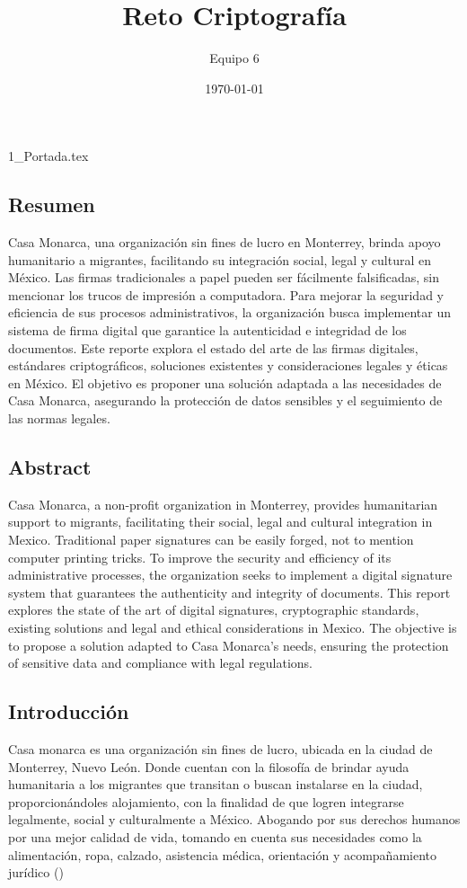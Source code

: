 \documentclass[12pt]{article}
\title{Reto Criptografía}
\author{Equipo 6}
\date{\today}
\begin{document}
{1_Portada.tex}
\newpage
\tableofcontents %
\thispagestyle{empty}

\newpage
\subsection{Resumen} %
Casa Monarca, una organización sin fines de lucro en Monterrey, brinda apoyo humanitario a migrantes, facilitando su integración social, legal y cultural en México. Las firmas tradicionales a papel pueden ser fácilmente falsificadas, sin mencionar los trucos de impresión a computadora. Para mejorar la seguridad y eficiencia de sus procesos administrativos, la organización busca implementar un sistema de firma digital que garantice la autenticidad e integridad de los documentos. Este reporte explora el estado del arte de las firmas digitales, estándares criptográficos, soluciones existentes y consideraciones legales y éticas en México. El objetivo es proponer una solución adaptada a las necesidades de Casa Monarca, asegurando la protección de datos sensibles y el seguimiento de las normas legales.

\subsection{Abstract}%
Casa Monarca, a non-profit organization in Monterrey, provides humanitarian support to migrants, facilitating their social, legal and cultural integration in Mexico. Traditional paper signatures can be easily forged, not to mention computer printing tricks. To improve the security and efficiency of its administrative processes, the organization seeks to implement a digital signature system that guarantees the authenticity and integrity of documents. This report explores the state of the art of digital signatures, cryptographic standards, existing solutions and legal and ethical considerations in Mexico. The objective is to propose a solution adapted to Casa Monarca's needs, ensuring the protection of sensitive data and compliance with legal regulations.

\newpage
\subsection{Introducción} %
Casa monarca es una organización sin fines de lucro, ubicada en la ciudad de Monterrey, Nuevo León. Donde cuentan con la filosofía de brindar ayuda humanitaria a los migrantes que transitan o buscan instalarse en la ciudad, proporcionándoles alojamiento, con la finalidad de que logren integrarse legalmente, social y culturalmente a México. Abogando por sus derechos humanos por una mejor calidad de vida, tomando en cuenta sus necesidades como la alimentación, ropa, calzado, asistencia médica, orientación y acompañamiento jurídico (\cite{CasaMonarca})
\end{document}
